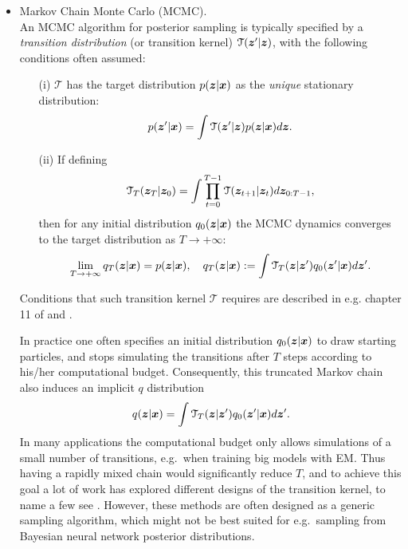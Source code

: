 \begin{itemize}
\item Markov Chain Monte Carlo (MCMC). \\
An MCMC algorithm for posterior sampling is typically specified by a \emph{transition distribution} (or transition kernel) $\mathcal{T}(\bm{z}' | \bm{z})$, with the following conditions often assumed:
\begin{itemize}
\item[(i)] $\mathcal{T}$ has the target distribution $p(\bm{z}|\bm{x})$ as the \emph{unique} stationary distribution:
$$ p(\bm{z}' | \bm{x}) = \int \mathcal{T}(\bm{z}' | \bm{z}) p(\bm{z} | \bm{x}) d \bm{z}. $$
\item[(ii)] If defining 
$$ \mathcal{T}_{T}(\bm{z}_T | \bm{z}_0) = \int \prod_{t=0}^{T-1} \mathcal{T}(\bm{z}_{t+1} | \bm{z}_t) d \bm{z}_{0:T-1},$$
then for any initial distribution $q_0(\bm{z} | \bm{x})$ the MCMC dynamics converges to the target distribution as $T \rightarrow +\infty$:
$$\lim_{T \rightarrow +\infty} q_{T}(\bm{z} | \bm{x}) = p(\bm{z} | \bm{x}), \quad q_{T}(\bm{z} | \bm{x}) := \int \mathcal{T}_{T}(\bm{z} | \bm{z}') q_0(\bm{z}' | \bm{x}) d \bm{z}' . $$
\end{itemize}
Conditions that such transition kernel $\mathcal{T}$ requires are described in e.g. chapter 11 of \cite{gelman:bda1995} and \cite{brooks:mcmcbook2011}.

In practice one often specifies an initial distribution $q_0(\bm{z} | \bm{x})$ to draw starting particles, and stops simulating the transitions after $T$ steps according to his/her computational budget. Consequently, this truncated Markov chain also induces an implicit $q$ distribution
\begin{equation}
q(\bm{z} | \bm{x}) = \int \mathcal{T}_{T}(\bm{z} | \bm{z}') q_0(\bm{z}' | \bm{x}) d \bm{z}' .
\end{equation}
In many applications the computational budget only allows simulations of a small number of transitions, e.g.~when training big models with EM. Thus having a rapidly mixed chain would significantly reduce $T$, and to achieve this goal a lot of work has explored different designs of the transition kernel, to name a few see \cite{ahn:sgfs2012, duane:hmc1987, neal:mcmc2011, girolami:riemann_hmc2011, ding:sgnht2014}. However, these methods are often designed as a generic sampling algorithm, which might not be best suited for e.g.~sampling from Bayesian neural network posterior distributions.
\end{itemize}

